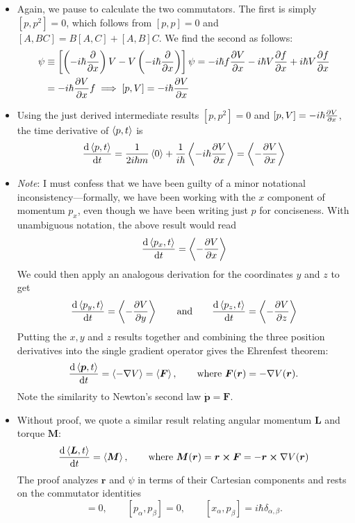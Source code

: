 \documentclass[11pt, a4paper]{article}
\renewcommand{\grad}{\nabla}
\newcommand{\eqtext}[1]{\qquad \text{#1} \qquad}
\renewcommand{\vec}[1]{\bm{#1}}  %
\renewcommand{\r}{\vec{r}}  %
\newcommand{\p}{\psi}  %
\begin{document}
\begin{itemize}
	\item Again, we pause to calculate the two commutators. The first is simply $ [p, p^{2}] = 0 $, which follows from $ [p, p] = 0 $ and $ [A, BC] = B[A, C] + [A, B]C $. We find the second as follows:
	\begin{align*}
		[p, V]\p &\equiv \left[ \left(-i\hbar \pdv{x}\right) V - V\left(-i\hbar \pdv{x}\right) \right] \p = - i \hbar f \pdv{V}{x} - i \hbar V \pdv{f}{x} + i \hbar V \pdv{f}{x} \\
		& =  - i \hbar \pdv{V}{x}f \implies [p, V] = - i \hbar \pdv{V}{x}
	\end{align*}
	
	\item Using the just derived intermediate results $  [p, p^{2}] = 0 $  and $ [p, V] = - i \hbar \pdv{V}{x} $, the time derivative of $ \ev{p, t} $ is 
	\begin{equation*}
		\dv{\ev{p, t}}{t} = \frac{1}{2i \hbar m}\ev{0} + \frac{1}{i\hbar} \ev{- i \hbar \pdv{V}{x}} = \ev{-\pdv{V}{x}}
	\end{equation*}
	
	\item \textit{Note}: I must confess that we have been guilty of a minor notational inconsistency---formally, we have been working with the $ x $ component of momentum $ p_{x} $, even though we have been writing just $ p $ for conciseness. With unambiguous notation, the above result would read
	\begin{equation*}
		\dv{\ev{p_{x}, t}}{t} = \ev{-\pdv{V}{x}}
	\end{equation*}
	We could then apply an analogous derivation for the coordinates $ y $ and $ z $ to get
	\begin{equation*}
		\dv{\ev{p_{y}, t}}{t} = \ev{-\pdv{V}{y}} \eqtext{and} \dv{\ev{p_{z}, t}}{t} =  \ev{-\pdv{V}{z}}
	\end{equation*}
	Putting the $ x, y $ and $ z $ results together and combining the three position derivatives into the single gradient operator gives the Ehrenfest theorem:
	\begin{equation*}
		\dv{\ev{\vec{p}, t}}{t} = \ev{-\grad V} = \ev{\vec{F}}, \qquad \text{where } \vec{F}(\r) = - \grad V(\r).
	\end{equation*}
	Note the similarity to Newton's second law $ \dot{\vec{p}} = \vec{F} $.
	
	\item Without proof, we quote a similar result relating angular momentum $ \vec{L} $ and torque $ \vec{M} $:
	\begin{equation*}
		\dv{\ev{\vec{L}, t}}{t} = \ev{\vec{M}}, \qquad \text{where } \vec{M}(\r) = \r \cross \vec{F} = - \r \cross \grad V(\r)
	\end{equation*}
	The proof analyzes $ \r $ and $ \p $ in terms of their Cartesian components and rests on the commutator identities
	\begin{equation*}
		[x_{\alpha}, x_{\beta}] = 0, \qquad [p_{\alpha}, p_{\beta}] = 0, \qquad [x_{\alpha}, p_{\beta}] = i \hbar \delta_{\alpha, \beta}.
	\end{equation*}
	
\end{itemize}
\end{document}
